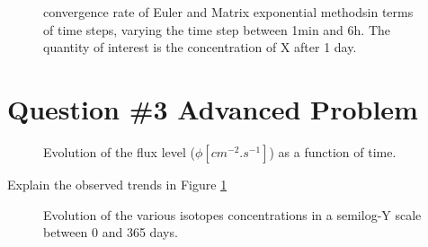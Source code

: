 \documentclass[11pt,a4paper]{article}
\begin{document}
\begin{figure}[h]
	\centering
	\caption{convergence rate of Euler and Matrix exponential methodsin terms of time steps, varying the time step between 1min and 6h. The quantity of interest is the concentration of X after 1 day.}
\end{figure}


\section{Question \#3 Advanced Problem}
 
\begin{figure}[h]
	\centering
	\caption{Evolution of the flux level ($\phi [cm^{-2}.s^{-1}]$) as a function of time.}
	\label{err}
\end{figure}
Explain the observed trends in Figure \ref{err} 

\begin{figure}[h]
	\centering
	\caption{Evolution of the various isotopes concentrations in a semilog-Y scale  between 0 and 365 days.}
	\label{err2}
\end{figure}



\end{document}
